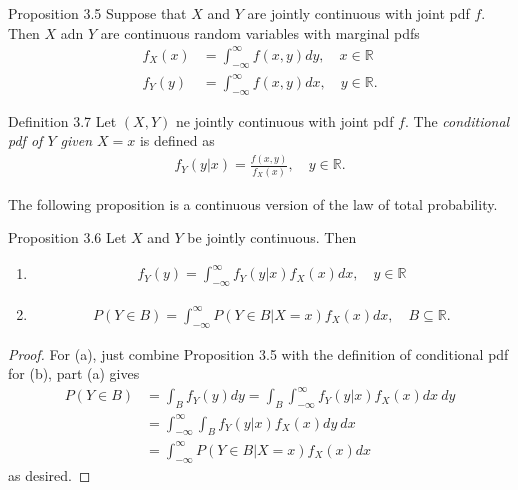 \begin{boks}{Proposition 3.5}
Suppose that $X$ and $Y$ are jointly continuous with joint pdf $f$. Then $X$ adn $Y$ are continuous random variables with marginal pdfs
\begin{align*}
    f_X(x) &= \int_{-\infty}^\infty f(x, y) dy, \quad x\in\mathbb{R} \\
    f_Y(y) &= \int_{-\infty}^\infty f(x,y) dx, \quad y\in\mathbb{R}.
\end{align*}
\end{boks}

\begin{boks}{Definition 3.7}
Let $(X, Y)$ ne jointly continuous with joint pdf $f$. The \textit{conditional pdf of $Y$ given $X=x$} is defined as
\begin{align*}
    f_Y(y|x) = \frac{f(x,y)}{f_X(x)}, \quad y\in\mathbb{R}.
\end{align*}
\end{boks}

The following proposition is a continuous version of the law of total probability.

\begin{boks}{Proposition 3.6}
Let $X$ and $Y$ be jointly continuous. Then
\begin{enumerate}
    \item
    \begin{align*}
        f_Y(y) = \int_{-\infty}^\infty f_Y(y|x)f_X(x)dx, \quad y\in\mathbb{R}
    \end{align*}
    \item
    \begin{align*}
        P(Y \in B) = \int_{-\infty}^\infty P(Y \in B|X = x)f_X(x)dx, \quad B\subseteq\mathbb{R}.
    \end{align*}
\end{enumerate}
\end{boks}

\begin{proof}
For (a), just combine Proposition 3.5 with the definition of conditional pdf for (b), part (a) gives
\begin{align*}
    P(Y \in B) &= \int_B f_Y(y)dy = \int_B \int_{-\infty}^\infty f_Y(y|x)f_X(x)dx \ dy \\
    &= \int_{-\infty}^\infty \int_B f_Y(y|x)f_X(x)dy \ dx \\
    &= \int_{-\infty}^\infty P(Y \in B|X = x) f_X(x)dx
\end{align*}
as desired.
\end{proof}

